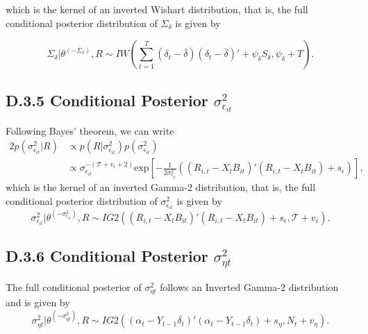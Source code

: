 which is the kernel of an inverted Wishart distribution, that is, the full conditional posterior distribution of $\Sigma_{\delta}$ is given by

    \begin{equation}
    \Sigma_{\delta}|\theta^{(-\Sigma_{\delta})},R \sim \mathit{IW}\left(\sum^{T}_{t=1}(\delta_{t}-\bar{\delta})(\delta_{t}-\bar{\delta})'+\psi_{\delta}S_{\delta},\psi_{\delta} + T\right).
\end{equation}

\subsection*{D.3.5 \hspace{0.1cm} Conditional Posterior $\sigma^2_{\epsilon_{it}}$}
Following Bayes' theorem, we can write
\begin{alignat}{2}
p(\sigma^2_{\epsilon_{it}}|R) &\propto p(R|\sigma^2_{\epsilon_{it}})p(\sigma^2_{\epsilon_{it}})  \nonumber  \\
 &\propto \sigma^{-(\mathcal{T}+v_\epsilon + 2)}_{\epsilon_{it}}  \text{exp}\left[-\frac{1}{2\sigma^2_{\epsilon_{it}}}\left((R_{i,t} - X_tB_{it})'(R_{i,t} - X_tB_{it}) + s_\epsilon\right)\right], 
\end{alignat} 
which is the kernel of an inverted Gamma-2 distribution, that is, the full conditional posterior distribution of $\sigma^2_{\epsilon_{it}}$ is given by 
\begin{equation}
    \sigma^2_{\epsilon_{it}}|\theta^{(-\sigma^2_{\epsilon_{it}})},R \sim \mathit{IG}2\left((R_{i,t} - X_tB_{it})'(R_{i,t} - X_tB_{it}) + s_\epsilon,\mathcal{T} + v_\epsilon \right).
\end{equation}

\subsection*{D.3.6 \hspace{0.1cm} Conditional Posterior $\sigma^2_{\eta t}$}
The full conditional posterior of $\sigma^2_{\eta t}$ follows an Inverted Gamma-2 distribution and is given by 
\begin{equation}
    \sigma^2_{\eta t}|\theta^{(-\sigma^2_{\eta t})},R \sim \mathit{IG}2\left((\alpha_{t} - Y_{t-1}\delta_{t})'(\alpha_{t} -  Y_{t-1}\delta_{t}) + s_\eta, N_t + v_\eta \right). 
\end{equation}

\newpage
